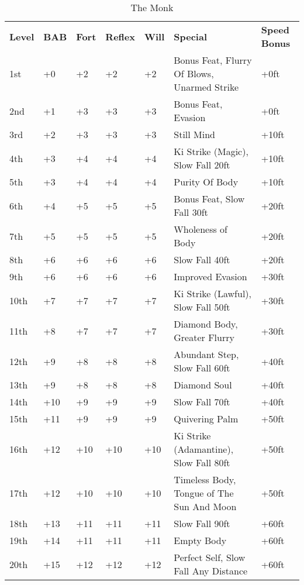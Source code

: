 \begin{table}[htb]
\caption{The Monk}
\centering
\begin{tabular}{*{7}{l}}
\textbf{Level} & \textbf{BAB} & \textbf{Fort} & \textbf{Reflex} & \textbf{Will} & \textbf{Special} & \textbf{Speed Bonus}\\
1st & +0 & +2 & +2 & +2 & Bonus Feat, Flurry Of Blows, Unarmed Strike & +0ft\\
2nd & +1 & +3 & +3 & +3 & Bonus Feat, Evasion & +0ft\\
3rd & +2 & +3 & +3 & +3 & Still Mind & +10ft\\
4th & +3 & +4 & +4 & +4 & Ki Strike (Magic), Slow Fall 20ft & +10ft\\
5th & +3 & +4 & +4 & +4 & Purity Of Body & +10ft\\
6th & +4 & +5 & +5 & +5 & Bonus Feat, Slow Fall 30ft & +20ft\\
7th & +5 & +5 & +5 & +5 & Wholeness of Body & +20ft\\
8th & +6 & +6 & +6 & +6 & Slow Fall 40ft & +20ft\\
9th & +6 & +6 & +6 & +6 & Improved Evasion & +30ft\\
10th & +7 & +7 & +7 & +7 & Ki Strike (Lawful), Slow Fall 50ft & +30ft\\
11th & +8 & +7 & +7 & +7 & Diamond Body, Greater Flurry & +30ft\\
12th & +9 & +8 & +8 & +8 & Abundant Step, Slow Fall 60ft & +40ft\\
13th & +9 & +8 & +8 & +8 & Diamond Soul & +40ft\\
14th & +10 & +9 & +9 & +9 & Slow Fall 70ft & +40ft\\
15th & +11 & +9 & +9 & +9 & Quivering Palm & +50ft\\
16th & +12 & +10 & +10 & +10 & Ki Strike (Adamantine), Slow Fall 80ft & +50ft\\
17th & +12 & +10 & +10 & +10 & Timeless Body, Tongue of The Sun And Moon & +50ft\\
18th & +13 & +11 & +11 & +11 & Slow Fall 90ft & +60ft\\
19th & +14 & +11 & +11 & +11 & Empty Body & +60ft\\
20th & +15 & +12 & +12 & +12 & Perfect Self, Slow Fall Any Distance & +60ft\\
\end{tabular}
\end{table}

\ClassFeatures

